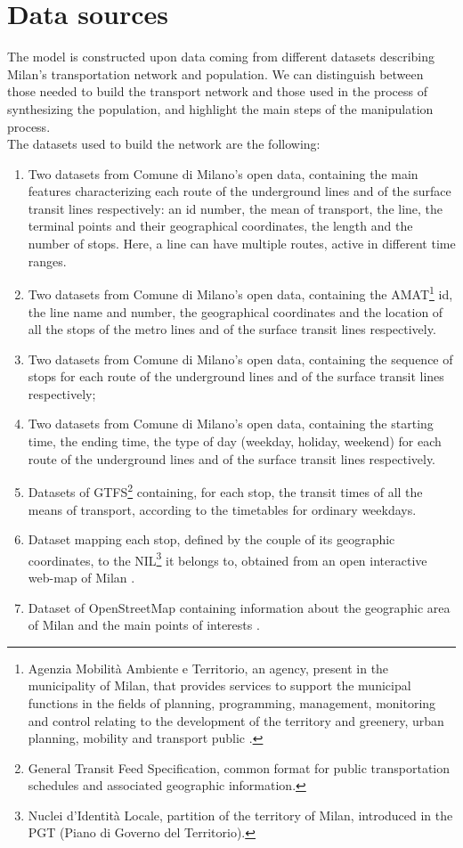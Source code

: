 
\section{Data sources}\label{sec:3.1}
The model is constructed upon data coming from different datasets describing Milan's transportation network and population. We can distinguish between those needed to build the transport network and those used in the process of synthesizing the population, and highlight the main steps of the manipulation process.\\
The datasets used to build the network are the following:
\begin{enumerate} 
    \item Two datasets \cite{site1, site5} from Comune di Milano's open data, containing the main features characterizing each route of the underground lines and of the surface transit lines respectively: an id number, the mean of transport, the line, the terminal points and their geographical coordinates, the length and the number of stops. Here, a line can have multiple routes, active in different time ranges.  
    \item Two datasets \cite{site2, site6} from Comune di Milano's open data, containing the AMAT\footnote{Agenzia Mobilità Ambiente e Territorio, an agency, present in the municipality of Milan, that provides services to support the municipal functions in the fields of planning, programming, management, monitoring and control relating to the development of the territory and greenery, urban planning, mobility and transport public \cite{site21}.} id, the line name and number, the geographical coordinates and the location of all the stops of the metro lines and of the surface transit lines respectively.
    \item Two datasets \cite{site3, site7} from Comune di Milano's open data, containing the sequence of stops for each route of the underground lines and of the surface transit lines respectively;
    \item Two datasets \cite{site4, site8} from Comune di Milano's open data, containing the starting time, the ending time, the type of day (weekday, holiday, weekend) for each route of the underground lines and  of the surface transit lines respectively. 
    \item Datasets \cite{site12} of GTFS\footnote{General Transit Feed Specification, common format for public transportation schedules and associated geographic information.} containing, for each stop, the transit times of all the means of transport, according to the timetables for ordinary weekdays. 
    \item Dataset mapping each stop, defined by the couple of its geographic coordinates, to the NIL\footnote{Nuclei d'Identità Locale, partition of the territory of Milan, introduced in the PGT (Piano di Governo del Territorio).} it belongs to, obtained from an open interactive web-map of Milan \cite{site22}.
    \item Dataset of OpenStreetMap containing information about the geographic area of Milan and the main points of interests \cite{site9}.
\end{enumerate} 
